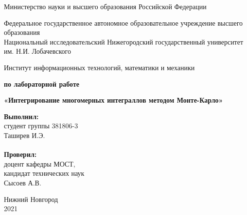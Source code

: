 \documentclass{report}
\begin{document}
\begin{titlepage}

\begin{center}
Министерство науки и высшего образования Российской Федерации
\end{center}

\begin{center}
Федеральное государственное автономное образовательное учреждение высшего образования \\
Национальный исследовательский Нижегородский государственный университет им. Н.И. Лобачевского
\end{center}

\begin{center}
Институт информационных технологий, математики и механики
\end{center}

\vspace{4em}

\begin{center}
\textbf{ по лабораторной работе} \\
\end{center}
\begin{center}
\textbf{\Large«Интегрирование многомерных интеграллов методом Монте-Карло»} \\
\end{center}

\vspace{4em}

\newbox{\lbox}
\newlength{\maxl}
\setlength{\maxl}{\wd\lbox}
\hfill\parbox{7cm}{
\hspace*{5cm}\hspace*{-5cm}\textbf{Выполнил:} \\ студент группы 381806-3 \\ Таширев И.Э.\\
\\
\hspace*{5cm}\hspace*{-5cm}\textbf{Проверил:}\\ доцент кафедры МОСТ, \\ кандидат технических наук \\ Сысоев А.В.\\
}
\vspace{\fill}

\begin{center} Нижний Новгород \\ 2021 \end{center}

\end{titlepage}
\end{document}
